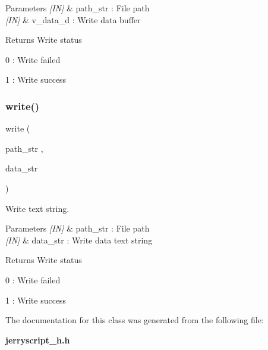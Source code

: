 \begin{DoxyCode}{0}
\end{DoxyCode}



\begin{DoxyParams}{Parameters}
{\em \mbox{[}\+I\+N\mbox{]}} & path\+\_\+str \+: File path \\
\hline
{\em \mbox{[}\+I\+N\mbox{]}} & v\+\_\+data\+\_\+d \+: Write data buffer \\
\hline
\end{DoxyParams}
\begin{DoxyReturn}{Returns}
Write status \begin{DoxyItemize}
\item 0 \+: Write failed \item 1 \+: Write success \end{DoxyItemize}

\end{DoxyReturn}
\mbox{\label{classfile_aaf117f090d9f4647b6f61bba28aa109c}} 
\subsubsection{write()\hspace{0.1cm}{\footnotesize\ttfamily [2/2]}}
{\footnotesize\ttfamily write (\begin{DoxyParamCaption}\item[{path\+\_\+str}]{,  }\item[{data\+\_\+str}]{ }\end{DoxyParamCaption})}



Write text string. 


\begin{DoxyCode}{0}
\end{DoxyCode}



\begin{DoxyParams}{Parameters}
{\em \mbox{[}\+I\+N\mbox{]}} & path\+\_\+str \+: File path \\
\hline
{\em \mbox{[}\+I\+N\mbox{]}} & data\+\_\+str \+: Write data text string \\
\hline
\end{DoxyParams}
\begin{DoxyReturn}{Returns}
Write status \begin{DoxyItemize}
\item 0 \+: Write failed \item 1 \+: Write success \end{DoxyItemize}

\end{DoxyReturn}


The documentation for this class was generated from the following file\+:\begin{DoxyCompactItemize}
\item 
\textbf{ jerryscript\+\_\+h.\+h}\end{DoxyCompactItemize}
